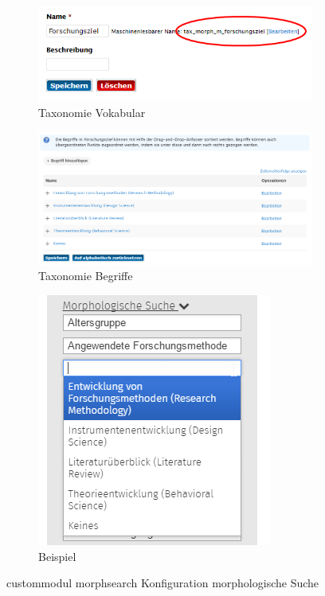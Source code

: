 \begin{itemize}[parsep=0pt, itemsep=5.0pt plus 2.0pt minus 1.0pt, leftmargin=*]
	\begin{figure}[H]
		\centering
		\begin{subfigure}[b]{0.35\textwidth}
			\centering
			\includegraphics[width=0.95\linewidth]{images/config_morphsearch_taxvoc}
			\caption[]{Taxonomie Vokabular}
			\label{fig:config_morphsearch_taxvoc}
		\end{subfigure}
		\begin{subfigure}[b]{0.40\textwidth}
			\centering
			\includegraphics[height=0.13\textheight]{images/config_morphsearch_taxvocbegriff}
			\caption[]{Taxonomie Begriffe}
			\label{fig:config_morphsearch_taxvocbegriff}
		\end{subfigure}
		\begin{subfigure}[b]{0.18\textwidth}
			\centering
			\includegraphics[height=0.13\textheight]{images/example_morphsearch_morphological}
			\caption[]{Beispiel}
			\label{fig:example_morphsearch_morphological}
		\end{subfigure}
		\caption{\gls{custommodul} morphsearch Konfiguration morphologische Suche}
		\label{fig:config_morphsearch_morphological}
	\end{figure}


\end{itemize}

